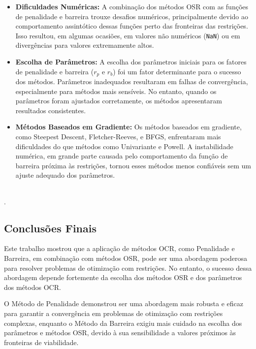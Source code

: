 \documentclass[a4paper, 12pt]{article}
\begin{document}
\begin{itemize}
    \item \textbf{Dificuldades Numéricas:} A combinação dos métodos OSR com as funções de penalidade e barreira trouxe desafios numéricos, principalmente devido ao comportamento assintótico dessas funções perto das fronteiras das restrições. Isso resultou, em algumas ocasiões, em valores não numéricos (\texttt{NaN}) ou em divergências para valores extremamente altos.

    \item \textbf{Escolha de Parâmetros:} A escolha dos parâmetros iniciais para os fatores de penalidade e barreira (\(r_p\) e \(r_b\)) foi um fator determinante para o sucesso dos métodos. Parâmetros inadequados resultaram em falhas de convergência, especialmente para métodos mais sensíveis. No entanto, quando os parâmetros foram ajustados corretamente, os métodos apresentaram resultados consistentes.

    \item \textbf{Métodos Baseados em Gradiente:} Os métodos baseados em gradiente, como Steepest Descent, Fletcher-Reeves, e BFGS, enfrentaram mais dificuldades do que métodos como Univariante e Powell. A instabilidade numérica, em grande parte causada pelo comportamento da função de barreira próxima às restrições, tornou esses métodos menos confiáveis sem um ajuste adequado dos parâmetros.\\\\
\end{itemize}



.
\newpage
\subsection{Conclusões Finais}

Este trabalho mostrou que a aplicação de métodos OCR, como Penalidade e Barreira, em combinação com métodos OSR, pode ser uma abordagem poderosa para resolver problemas de otimização com restrições. No entanto, o sucesso dessa abordagem depende fortemente da escolha dos métodos OSR e dos parâmetros dos métodos OCR. 

O Método de Penalidade demonstrou ser uma abordagem mais robusta e eficaz para garantir a convergência em problemas de otimização com restrições complexas, enquanto o Método da Barreira exigiu mais cuidado na escolha dos parâmetros e métodos OSR, devido à sua sensibilidade a valores próximos às fronteiras de viabilidade.
\end{document}
